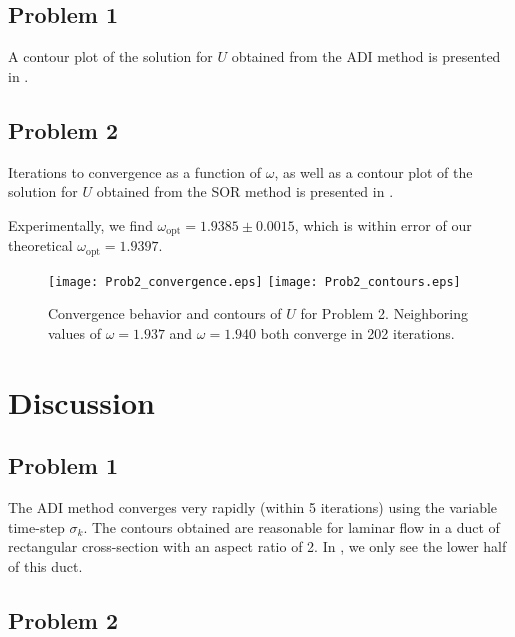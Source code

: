 \documentclass[11pt]{article}
\begin{document}
\subsection{Problem 1}

A contour plot of the solution for $U$ obtained from the ADI method is presented in .

\subsection{Problem 2}

Iterations to convergence as a function of $\omega$, as well as a contour plot of the solution for $U$ obtained from the SOR method is presented in .

Experimentally, we find $\omega_\text{opt} = 1.9385 \pm 0.0015$, which is within error of our theoretical $\omega_\text{opt} = 1.9397$.

\begin{figure}[h!]
\begin{center}
\texttt{[image: Prob2\_convergence.eps]}
\texttt{[image: Prob2\_contours.eps]}
\\[0.5cm]
\caption{Convergence behavior and contours of $U$ for Problem 2. Neighboring values of $\omega = 1.937$ and $\omega = 1.940$ both converge in 202 iterations.}
\label{fig:Prob2}
\end{center}
\end{figure}

\section{Discussion} %

\subsection{Problem 1}

The ADI method converges very rapidly (within 5 iterations) using the variable time-step $\sigma_k$. The contours obtained are reasonable for laminar flow in a duct of rectangular cross-section with an aspect ratio of 2. In , we only see the lower half of this duct.

\subsection{Problem 2}
\end{document}
